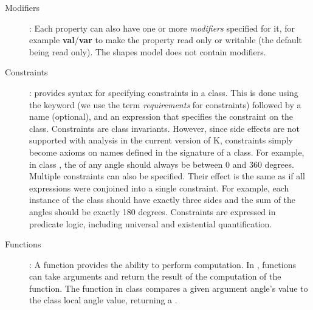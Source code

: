 \begin{description}
\item [Modifiers]: Each property can also have one or more
  {\em modifiers} specified for it, for example
  {\bf val}/{\bf var} to make the property read only or writable (the default being
    read only). The shapes model does not contain modifiers.
  
\item [Constraints]: \Klang{} provides syntax for specifying
  constraints in a class. This is done using the  keyword
  (we use the term {\em requirements} for constraints) followed by a
  name (optional), and an expression that specifies the constraint on
  the class. Constraints are class invariants. However, since side
  effects are not supported with analysis in the current version of K, 
  constraints simply
  become axioms on names defined in the signature of a class. For
  example, in class , the  of any angle should
  always be between 0 and 360 degrees. Multiple constraints can also
  be specified. Their effect is the same as if all expressions were
  conjoined into a single constraint. For example, each instance of
  the  class should have exactly three sides and the
  sum of the angles should be exactly 180 degrees. Constraints are
  expressed in predicate logic, including universal and existential
  quantification.
  
\item [Functions]: A function provides the ability to perform
  computation. In \Klang{}, functions can take arguments and return
  the result of the computation of the function. The 
  function in class  compares a given argument angle's value to
  the class local angle value, returning a .


\end{description}
